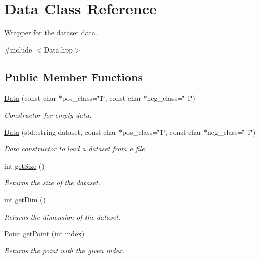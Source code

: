 \hypertarget{class_data}{}\section{Data Class Reference}
\label{class_data}


Wrapper for the dataset data.  




{\ttfamily \#include $<$Data.\+hpp$>$}

\subsection*{Public Member Functions}
\begin{DoxyCompactItemize}
\item 
\hyperlink{class_data_aa3ca35c963eec5a4734df23f88443077}{Data} (const char $\ast$pos\+\_\+class=\char`\"{}1\char`\"{}, const char $\ast$neg\+\_\+class=\char`\"{}-\/1\char`\"{})
\begin{DoxyCompactList}\small\item\em Constructor for empty data. \end{DoxyCompactList}\item 
\hyperlink{class_data_a85afba1f115dce4b6d2a952326624dd4}{Data} (std\+::string dataset, const char $\ast$pos\+\_\+class=\char`\"{}1\char`\"{}, const char $\ast$neg\+\_\+class=\char`\"{}-\/1\char`\"{})
\begin{DoxyCompactList}\small\item\em \hyperlink{class_data}{Data} constructor to load a dataset from a file. \end{DoxyCompactList}\item 
int \hyperlink{class_data_abfd7c7cca66a186ff45efa430bcb2f1e}{get\+Size} ()
\begin{DoxyCompactList}\small\item\em Returns the size of the dataset. \end{DoxyCompactList}\item 
int \hyperlink{class_data_a0391940729a8023ea9b154132a854d35}{get\+Dim} ()
\begin{DoxyCompactList}\small\item\em Returns the dimension of the dataset. \end{DoxyCompactList}\item 
\hyperlink{class_point}{Point} \hyperlink{class_data_a8cc66e410f7288913204585f215b786d}{get\+Point} (int index)
\begin{DoxyCompactList}\small\item\em Returns the point with the given index. \end{DoxyCompactList}\item 

\end{DoxyCompactItemize}
